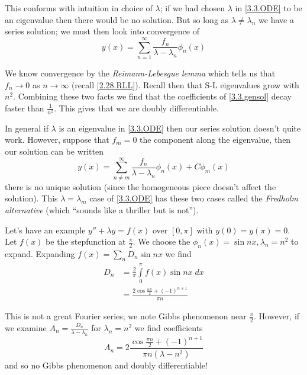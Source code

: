 \documentclass[10pt]{report}
\begin{document}
This conforms with intuition in choice of $\lambda$; if we had chosen $\lambda$ in \eqref{3.3.ODE} to be an eigenvalue then there would be no solution. But so long as $\lambda \neq \lambda_n$ we have a series solution; we must then look into convergence of
\begin{equation}
    y(x) = \sum_{n=1}^{\infty}\frac{f_n}{\lambda - \lambda_n}\phi_n(x)\label{3.3.gensol}
\end{equation}

We know convergence by the \emph{Reimann-Lebesgue lemma} which tells us that $f_n \to 0$ as $n \to \infty$ (recall \eqref{2.28.RLL}). Recall then that S-L eigenvalues grow with $n^2$. Combining these two facts we find that the coefficients of \eqref{3.3.gensol} decay faster than $\frac{1}{n^2}$. This gives that we are doubly differentiable.

In general if $\lambda$ is an eigenvalue in \eqref{3.3.ODE} then our series solution doesn't quite work. However, suppose that $f_m = 0$ the component along the eigenvalue, then our solution can be written 
\begin{equation}
    y(x) = \sum_{n \neq m}^{\infty}\frac{f_n}{\lambda - \lambda_n}\phi_n(x) + C\phi_m(x)
\end{equation}
there is no unique solution (since the homogeneous piece doesn't affect the solution). This $\lambda = \lambda_m$ case of \eqref{3.3.ODE} has these two cases called the \emph{Fredholm alternative} (which ``sounds like a thriller but is not''). 

Let's have an example $y'' + \lambda y = f(x)$ over $[0,\pi]$ with $y(0) = y(\pi) = 0$. Let $f(x)$ be the stepfunction at $\frac{\pi}{2}$. We choose the $\phi_n(x) = \sin nx, \lambda_n = n^2$ to expand. Expanding $f(x) = \sum_{n}^{}D_n\sin nx$ we find
\begin{align}
    D_n &= \frac{2}{\pi}\displaystyle\int\limits_{0}^{\pi}f(x)\sin nx\;dx\\
    &= \frac{2\cos \frac{n\pi}{2} + (-1)^{n+1}}{\pi n}
\end{align}

This is not a great Fourier series; we note Gibbs phenomenon near $\frac{\pi}{2}$. However, if we examine $A_n = \frac{D_n}{\lambda - \lambda_n}$ for $\lambda_n = n^2$ we find coefficients
\begin{equation}
    A_n = 2\frac{\cos \frac{\pi n}{2} + \left( -1 \right)^{n+1}}{\pi n\left( \lambda - n^2 \right)}
\end{equation}
and so no Gibbs phenomenon and doubly differentiable! 
\end{document}

